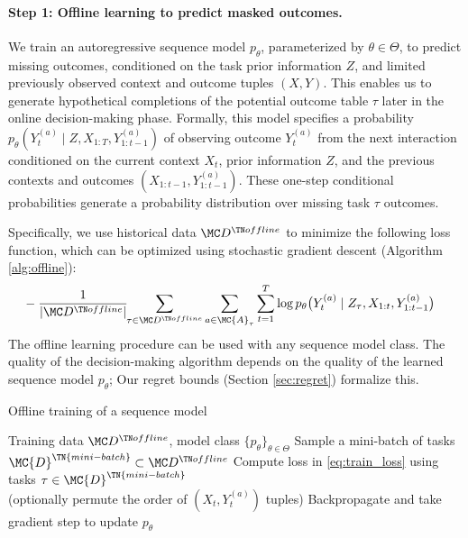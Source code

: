 \paragraph{Step 1: Offline learning to predict masked outcomes.}
We train an autoregressive sequence model $p_{\theta}$, parameterized by $\theta \in \Theta$, to predict missing outcomes, conditioned on the task prior information $Z$, and limited previously observed context and outcome tuples $(X, Y)$. This enables us to generate hypothetical completions of the potential outcome table $\tau$ later in the online decision-making phase. Formally, this model specifies a probability $p_{\theta}(Y_{t}^{(a)} \mid Z, X_{1:T}, Y_{1 : t-1}^{(a)} )$ of observing outcome $Y_{t}^{(a)}$ from the next interaction conditioned on the current context $X_t$, prior information $Z$, and the previous contexts and outcomes $(X_{1:t-1}, Y_{1: t-1}^{(a)})$. These one-step conditional probabilities generate a probability distribution over missing task $\tau$ outcomes. 


Specifically, we use historical data $\Dtrain$ to minimize the following loss function, which can be optimized using stochastic gradient descent (Algorithm \ref{alg:offline}): 
\begin{align}
    \label{eq:train_loss}
    &- \frac{1}{|\Dtrain|} \hspace{-1mm} \sum_{\tau \in \Dtrain} \sum_{a \in \MC{A}_{\tau}} \sum_{t=1}^T \log p_{\theta} \big( Y_t^{(a)} \mid  Z_{\tau}, X_{1:t}, Y_{1:t-1}^{(a)} \big)
\end{align}
The offline learning procedure can be used with any sequence model class. The quality of the decision-making algorithm depends on the quality of the learned sequence model $p_\theta$; Our regret bounds (Section \ref{sec:regret}) formalize this.
\begin{algorithm}[h]
  \caption{Offline training of a sequence model}
  \label{alg:offline}
  \begin{algorithmic}[1]
    \REQUIRE Training data $\Dtrain$, model class $\{p_\theta\}_{\theta \in \Theta}$
        \STATE Sample a mini-batch of tasks $\MC{D}^{\TN{mini-batch}} \subset \Dtrain$
        \STATE Compute loss in \eqref{eq:train_loss} using tasks $\tau \in \MC{D}^{\TN{mini-batch}}$ \\(optionally permute the order of $(X_t, Y_t^{(a)})$ tuples)
        \STATE Backpropagate and take gradient step to update $p_\theta$
    \ENDWHILE
  \end{algorithmic}
\end{algorithm}


